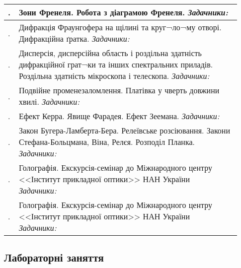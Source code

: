 \documentclass{Syllabus}
\def\probl{\textit{Задачники:\ }}
\begin{document}
\begin{center}
\begin{longtable}{|>{\arraybackslash}m{0.03\linewidth}|>{\raggedright\arraybackslash}m{0.9\linewidth}|}
		\\\hline
		\rownumber. &  Зони Френеля. Робота з діаграмою Френеля.
        \newline \probl{}  \cite{Ivanova}
		\\\hline
		\rownumber. & Дифракція Фраунгофера на щілині та круг¬ло¬му отворі. Дифракційна ґратка.
        \newline \probl{}  \cite{Ivanova}
    	\\\hline
		\rownumber. & Дисперсія, дисперсійна область і роздільна здатність дифракційної грат¬ки та інших спектральних приладів. Роздільна здатність мікроскопа і телескопа.
        \newline \probl{}  \cite{Ivanova}
		\\\hline
		\rownumber. & Подвійне променезаломлення. Платівка у чверть довжини хвилі.
        \newline \probl{}  \cite{Ivanova}
		\\\hline
		\rownumber. & Ефект Керра. Явище Фарадея. Ефект Зеемана.
        \newline \probl{}  \cite{Ivanova}
        \\\hline
		\rownumber. & Закон Бугера-Ламберта-Бера. Релеївське розсіювання. Закони Стефана-Больцмана, Віна, Релєя. Розподіл Планка.
        \newline \probl{}   \cite{Ivanova}
		\\\hline
		\rownumber. & Голографія. Екскурсія-семінар до Міжнародного центру <<Інститут прикладної оптики>> НАН України
        \newline \probl{}  \cite{Ivanova}
		\\\hline
		\rownumber. & Голографія. Екскурсія-семінар до Міжнародного центру <<Інститут прикладної оптики>> НАН України
        \newline \probl{}  \cite{Ivanova}
		\\\hline
	\end{longtable}
\end{center}

\vspace*{-3em}
\subsection*{Лабораторні заняття}\setcounter{magicrownumbers}{0}
\end{document}
